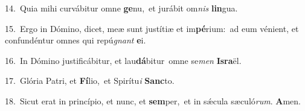{\numbfont\textcolor{\numbcolor}{14.}}~Quia mihi curvábitur omne \textbf{ge}\-nu,~\star et jurábit om\textit{nis} \textbf{lin}\-gua.\par
{\numbfont\textcolor{\numbcolor}{15.}}~Ergo in Dómino, dicet, meæ sunt justítiæ et im\-\textbf{pé}\-rium:~\star ad eum vénient, et confundéntur omnes qui repú\textit{gnant} \textbf{e}\-i.\par
{\numbfont\textcolor{\numbcolor}{16.}}~In Dómino justificábitur, et lau\-\textbf{dá}\-bitur~\star omne se\textit{men} \textbf{Is}\-\textbf{ra}ël.\par
{\numbfont\textcolor{\numbcolor}{17.}}~Glória Patri, et \textbf{Fí}\-lio,~\star et Spirítu\textit{i} \textbf{Sanc}\-to.\par
{\numbfont\textcolor{\numbcolor}{18.}}~Sicut erat in princípio, et nunc, et \textbf{sem}\-per,~\star et in sǽcula sæculó\-\textit{rum}\-. \textbf{A}\-men.\par
